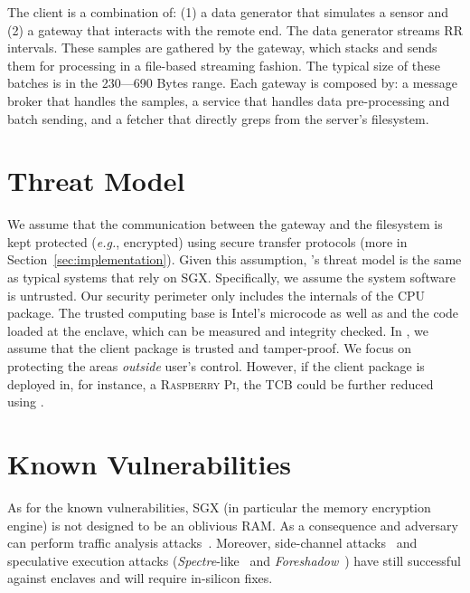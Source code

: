 The client is a combination of: (1) a data generator that simulates a sensor and (2) a gateway that interacts with the remote end. 
The data generator streams RR intervals. %
These samples are gathered by the gateway, which stacks and sends them for processing in a file-based streaming fashion. 
The typical size of these batches is in the 230---690 Bytes range.
Each gateway is composed by: a message broker that handles the samples, a service that handles data pre-processing and batch sending, and a fetcher that directly greps from the server's filesystem.

\section{Threat Model} \label{sec:threat}

We assume that the communication between the gateway and the filesystem is kept protected (\emph{e.g.}, encrypted) using secure transfer protocols (more in Section~\ref{sec:implementation}).
Given this assumption, \projName's threat model is the same as typical systems that rely on \textsc{SGX}. 
Specifically, we assume the system software is  untrusted.
Our security perimeter only includes the internals of the CPU package. 
The trusted computing base is Intel's microcode as well as and the code loaded at the enclave, which can be measured and integrity checked. 
In \projName, we assume that the client package is trusted and tamper-proof.
We focus on protecting the areas \emph{outside} user's control. 
However, if the client package is deployed in, for instance, a \textsc{Raspberry Pi}, the TCB could be further reduced using .

\section{Known Vulnerabilities} \label{sec:vulnerabilities}

As for the known vulnerabilities, \textsc{SGX} (in particular the memory encryption engine) is not designed to be an oblivious RAM.
As a consequence and adversary can perform traffic analysis attacks~\cite{Gueron2016}.
Moreover, side-channel attacks~\cite{sgx-sidechannel} and speculative execution attacks (\textit{Spectre}-like~\cite{sgx-spectre} and \textit{Foreshadow}~\cite{foreshadow}) have still successful against enclaves and will require in-silicon fixes.

